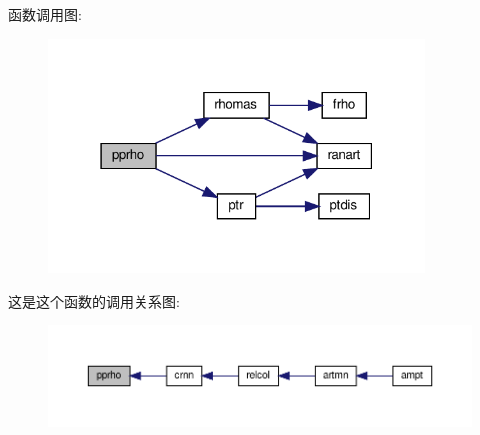 函数调用图\+:
\nopagebreak
\begin{figure}[H]
\begin{center}
\leavevmode
\includegraphics[width=283pt]{pprho_8f90_a12464f29a9b7eab7d9061308c9094a1a_cgraph}
\end{center}
\end{figure}
这是这个函数的调用关系图\+:
\nopagebreak
\begin{figure}[H]
\begin{center}
\leavevmode
\includegraphics[width=350pt]{pprho_8f90_a12464f29a9b7eab7d9061308c9094a1a_icgraph}
\end{center}
\end{figure}
